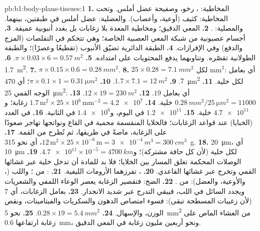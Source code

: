 \begin{solution}{pb:b1:body-plans-tissues:1}
\textbf{1.} المخاطية: ،  رخو، وصفيحة عضل أملس. وتحت
المخاطية:  كثيف (أوعية، وأعصاب). والعضلية: عضل أملس في
طبقتين،  بينهما. والمصلية:  .
\textbf{2.} المعي الدقيق؛ ومخاطية المعدة بلا زغابات بل بغدد أنبوبية
عميقة.
\textbf{3.} أجسام عصبونية من شبكة المعي العصبية الخاصة؛ وهي تتحكم في
التقلصات (المزج والدفع) وفي الإفرازات.
\textbf{4.} الطبقة الدائرية تضيّق الأنبوب (تقطيعًا وعصرًا)؛ والطبقة
الطولانية تقصّره. وتناوبهما يدفع المحتويات على امتداده.
\textbf{5.} $\pi\times 0.03\times 6 = \qty{0.57}{m^2}$.
\textbf{6.} \qty{1.7}{m^2}.
\textbf{7.} $\pi\times 0.15\times 0.6 = \qty{0.28}{mm^2}$.
\textbf{8.} $25\times 0.28 = \qty{7.1}{mm^2}$ لكل mm$^2$: أي بعامل
$7$.
\textbf{9.} $1.7\times 7.1 = \qty{12}{m^2}$.
\textbf{10.} $\pi\times 0.1\times 1 = \qty{0.31}{\micro m^2}$؛ أي
\qty{470}{\micro m^2} لكل خلية.
\textbf{11.} الوجه القمي \qty{25}{\micro m^2}: أي بعامل $19$.
\textbf{12.} $12\times 19 = \qty{230}{m^2}$.
\textbf{13.} $\qty{0.28}{mm^2}/\qty{25}{\micro m^2} = \num{11000}$ خلية.
\textbf{14.} $1.7\,\mathrm{m^2}\times 25\times 10^6\,\mathrm{mm^{-2}} =
\num{4.2e7}$ زغابة؛ و$\num{4.7e11}$ خلية.
\textbf{15.} $\num{1.2e11}$ في اليوم، و$\num{1.4e6}$ في الثانية.
\textbf{16.} في الغدد (الخبايا) عند قواعد الزغابات؛ فالخلايا
المنقسمة محمية في القاع ونواتجها تهاجر صعودًا على الزغابة، ماصةً في
طريقها، ثم تُطرح من القمة.
\textbf{17.} $12\,\mathrm{m^2}\times 25\times 10^{-6}\,\mathrm{m} =
\qty{3e-4}{m^3} = \qty{300}{cm^3}$، أي نحو \qty{315}{g}.
\textbf{18.}  \qty{20}{\micro m}، أي \qty{10}{\micro m} لكل
خلية (لأن كل حافة مشتركة)؛
و$\num{4.7e11}\times 10^{-5} = \qty{4700}{km}$.
\textbf{19.} الوصلات المحكمة تغلق المسار بين الخلايا؛ فلا بد للمادة
أن تدخل خلية عبر غشائها القمي وتخرج عبر غشائها القاعدي.
\textbf{20.}  ، تفرزهما الأرومات الليفية.
\textbf{21.} : من ؛ واللب (،
والأوعية، والعضل): من .
\textbf{22.} الضخ: فتقصير الزغابة يعصر الوعاء اللمفي والشعريات ويجدد
السائل في اللب، فيبقي التدرج عبر  شديد الانحدار.
\textbf{23.} بعامل الزغابات، أي $7$ (لأن زغيبات  المسطحة
تبقى): فسوء امتصاص الدهون والسكريات والفيتامينات، ونقص الوزن،
والإسهال.
\textbf{24.} $0.28\times 19 = \qty{5.4}{mm^2}$.
\textbf{25.} نحو \qty{5}{mm^2} من الغشاء الماص على زغابة ارتفاعها
\qty{0.6}{mm}، ونحو أربعين مليون زغابة في المعي الدقيق.
\end{solution}
